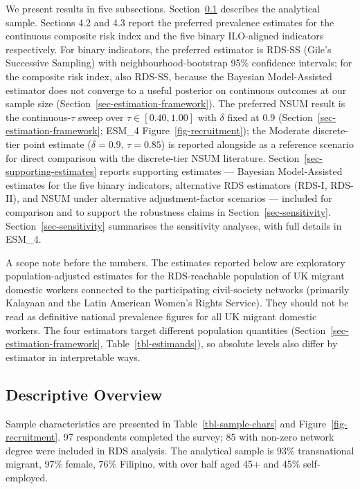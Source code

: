 \documentclass[
  12pt,
  letterpaper,
  DIV=11,
  numbers=noendperiod]{scrartcl}
\begin{document}
We present results in five subsections. Section~\ref{sec-descriptive}
describes the analytical sample. Sections 4.2 and 4.3 report the
preferred prevalence estimates for the continuous composite risk index
and the five binary ILO-aligned indicators respectively. For binary
indicators, the preferred estimator is RDS-SS (Gile's Successive
Sampling) with neighbourhood-bootstrap 95\% confidence intervals; for
the composite risk index, also RDS-SS, because the Bayesian
Model-Assisted estimator does not converge to a useful posterior on
continuous outcomes at our sample size
(Section~\ref{sec-estimation-framework}). The preferred NSUM result is
the continuous-\(\tau\) sweep over \(\tau \in [0.40, 1.00]\) with
\(\delta\) fixed at 0.9 (Section~\ref{sec-estimation-framework}; ESM\_4
Figure~\ref{fig-recruitment}); the Moderate discrete-tier point estimate
(\(\delta = 0.9\), \(\tau = 0.85\)) is reported alongside as a reference
scenario for direct comparison with the discrete-tier NSUM literature.
Section~\ref{sec-supporting-estimates} reports supporting estimates ---
Bayesian Model-Assisted estimates for the five binary indicators,
alternative RDS estimators (RDS-I, RDS-II), and NSUM under alternative
adjustment-factor scenarios --- included for comparison and to support
the robustness claims in Section~\ref{sec-sensitivity}.
Section~\ref{sec-sensitivity} summarises the sensitivity analyses, with
full details in ESM\_4.

A scope note before the numbers. The estimates reported below are
exploratory population-adjusted estimates for the RDS-reachable
population of UK migrant domestic workers connected to the participating
civil-society networks (primarily Kalayaan and the Latin American
Women's Rights Service). They should not be read as definitive national
prevalence figures for all UK migrant domestic workers. The four
estimators target different population quantities
(Section~\ref{sec-estimation-framework}, Table~\ref{tbl-estimands}), so
absolute levels also differ by estimator in interpretable ways.

\subsection{Descriptive Overview}\label{sec-descriptive}

Sample characteristics are presented in Table~\ref{tbl-sample-chars} and
Figure~\ref{fig-recruitment}. 97 respondents completed the survey; 85
with non-zero network degree were included in RDS analysis. The
analytical sample is 93\% transnational migrant, 97\% female, 76\%
Filipino, with over half aged 45+ and 45\% self-employed.
\end{document}
